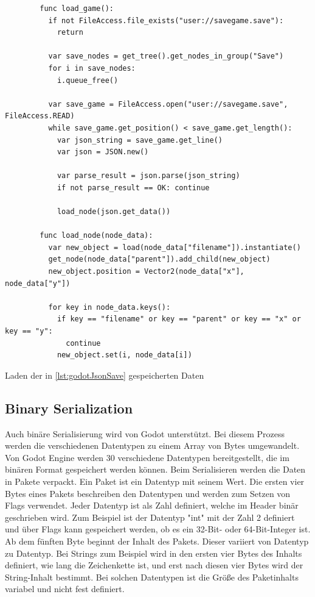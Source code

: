 \begin{listing}[htp]
    \begin{verbatim}
        func load_game():
          if not FileAccess.file_exists("user://savegame.save"):
            return

          var save_nodes = get_tree().get_nodes_in_group("Save")
          for i in save_nodes:
            i.queue_free()

          var save_game = FileAccess.open("user://savegame.save", FileAccess.READ)
          while save_game.get_position() < save_game.get_length():
            var json_string = save_game.get_line()
            var json = JSON.new()

            var parse_result = json.parse(json_string)
            if not parse_result == OK: continue

            load_node(json.get_data())

        func load_node(node_data):
          var new_object = load(node_data["filename"]).instantiate()
          get_node(node_data["parent"]).add_child(new_object)
          new_object.position = Vector2(node_data["x"], node_data["y"])

          for key in node_data.keys():
            if key == "filename" or key == "parent" or key == "x" or key == "y":
              continue
            new_object.set(i, node_data[i])
    \end{verbatim}
    \caption{Laden der in \ref{lst:godotJsonSave} gespeicherten Daten \cite{godotengineSavingGames}}
    \label{lst:godotJsonLoad}
\end{listing} 



\subsection{Binary Serialization}
Auch binäre Serialisierung wird von Godot unterstützt. Bei diesem Prozess werden die verschiedenen Datentypen zu einem Array von Bytes umgewandelt. Von Godot Engine werden 30 verschiedene Datentypen\cite{godotengineBinarySerialization} bereitgestellt, die im binären Format gespeichert werden können. Beim Serialisieren werden die Daten in Pakete verpackt. Ein Paket ist ein Datentyp mit seinem Wert. Die ersten vier Bytes eines Pakets beschreiben den Datentypen und werden zum Setzen von Flags verwendet. Jeder Datentyp ist als Zahl definiert, welche im Header binär geschrieben wird. Zum Beispiel ist der Datentyp "int" mit der Zahl 2 definiert und über Flags kann gespeichert werden, ob es ein 32-Bit- oder 64-Bit-Integer ist. Ab dem fünften Byte beginnt der Inhalt des Pakets. Dieser variiert von Datentyp zu Datentyp. Bei Strings zum Beispiel wird in den ersten vier Bytes des Inhalts definiert, wie lang die Zeichenkette ist, und erst nach diesen vier Bytes wird der String-Inhalt bestimmt. Bei solchen Datentypen ist die Größe des Paketinhalts variabel und nicht fest definiert.\cite{godotengineBinarySerialization}


